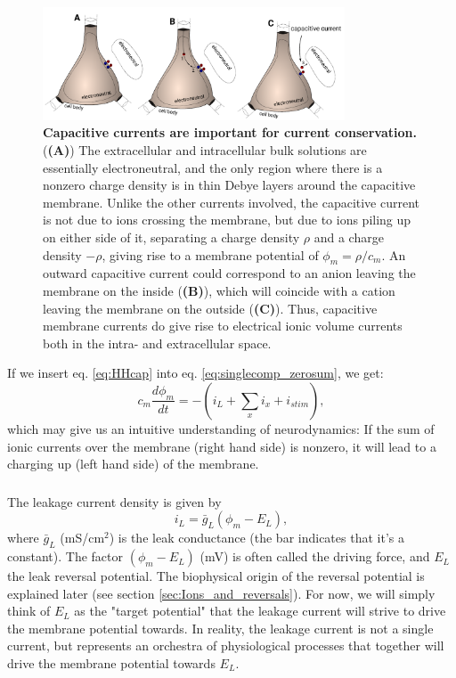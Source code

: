 \begin{figure}[!ht]
\begin{center}
\includegraphics[width=0.8\textwidth]{Figures/Neuron/capacitive_currents.pdf}
\end{center}
\caption{\textbf{Capacitive currents are important for current conservation.}  (\textbf{(A)}) The extracellular and intracellular bulk solutions are essentially electroneutral, and the only region where there is a nonzero charge density is in thin Debye layers around the capacitive membrane. Unlike the other currents involved, the capacitive current is not due to ions crossing the membrane, but due to ions piling up on either side of it, separating a charge density $\rho$ and a charge density $-\rho$, giving rise to a membrane potential of $\phi_m = \rho/c_m$. An outward capacitive current could correspond to an anion leaving the membrane on the inside (\textbf{(B)}), which will coincide with a cation leaving the membrane on the outside (\textbf{(C)}). Thus, capacitive membrane currents do give rise to electrical ionic volume currents both in the intra- and extracellular space.
}
\label{Neuron:fig:capacitive_currents}
\end{figure}

If we insert eq. \ref{eq:HHcap} into eq. \ref{eq:singlecomp_zerosum}, we get:
\begin{equation}
c_m \frac{d\phi_m}{dt} = - (i_L + \sum_x{i_x} +  i_{stim}),
\label{eq:singlecomp_capinserted}
\end{equation}
which may give us an intuitive understanding of neurodynamics: If the sum of ionic currents over the membrane (right hand side) is nonzero, it will lead to a charging up (left hand side) of the membrane. 


\subsubsection{}
The leakage current density is given by
\begin{equation}
i_L = \bar{g}_L (\phi_m - E_L),
\label{eq:HHleak}
\end{equation}
where $\bar{g}_L$ (mS/cm$^2$) is the leak conductance (the bar indicates that it's a constant). The factor $(\phi_m - E_L)$ (mV) is often called the driving force, and $E_L$ the leak reversal potential. The biophysical origin of the reversal potential is explained later (see section \ref{sec:Ions_and_reversals}). For now, we will simply think of $E_L$ as the "target potential" that the leakage current will strive to drive the membrane potential towards. In reality, the leakage current is not a single current, but represents an orchestra of physiological processes that together will drive the membrane potential towards $E_L$. 

